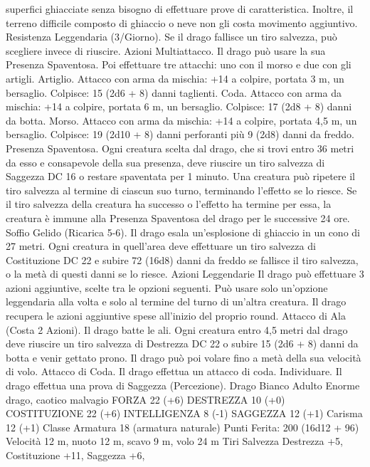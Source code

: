 \begin{multicols}{2}
superfici ghiacciate senza bisogno di effettuare prove di
caratteristica. Inoltre, il terreno difficile composto di ghiaccio o neve
non gli costa movimento aggiuntivo.
Resistenza Leggendaria (3/Giorno). Se il drago fallisce un tiro
salvezza, può scegliere invece di riuscire.
Azioni
Multiattacco. Il drago può usare la sua Presenza Spaventosa. Poi
effettuare tre attacchi: uno con il morso e due con gli artigli.
Artiglio. Attacco con arma da mischia: +14 a colpire, portata 3
m, un bersaglio.
Colpisce: 15 (2d6 + 8) danni taglienti.
Coda. Attacco con arma da mischia: +14 a colpire, portata 6 m,
un bersaglio.
Colpisce: 17 (2d8 + 8) danni da botta.
Morso. Attacco con arma da mischia: +14 a colpire, portata 4,5
m, un bersaglio.
Colpisce: 19 (2d10 + 8) danni perforanti più 9 (2d8) danni da freddo.
Presenza Spaventosa. Ogni creatura scelta dal drago, che si trovi
entro 36 metri da esso e consapevole della sua presenza, deve
riuscire un tiro salvezza di Saggezza DC 16 o restare spaventata per
1 minuto. Una creatura può ripetere il tiro salvezza al termine di
ciascun suo turno, terminando l’effetto se lo riesce. Se il tiro salvezza
della creatura ha successo o l’effetto ha termine per essa, la creatura è
immune alla Presenza Spaventosa del drago per le successive 24 ore.
Soffio Gelido (Ricarica 5-6). Il drago esala un’esplosione di ghiaccio
in un cono di 27 metri. Ogni creatura in quell’area deve effettuare un tiro
salvezza di Costituzione DC 22 e subire 72 (16d8) danni da freddo se
fallisce il tiro salvezza, o la metà di questi danni se lo riesce.
Azioni Leggendarie
Il drago può effettuare 3 azioni aggiuntive, scelte tra le opzioni
seguenti. Può usare solo un’opzione leggendaria alla volta e solo
al termine del turno di un’altra creatura. Il drago recupera le
azioni aggiuntive spese all’inizio del proprio round.
Attacco di Ala (Costa 2 Azioni). Il drago batte le ali. Ogni creatura
entro 4,5 metri dal drago deve riuscire un tiro salvezza di Destrezza
DC 22 o subire 15 (2d6 + 8) danni da botta e venir gettato prono.
Il drago può poi volare fino a metà della sua velocità di volo.
Attacco di Coda. Il drago effettua un attacco di coda.
Individuare. Il drago effettua una prova di Saggezza (Percezione).
Drago Bianco Adulto
Enorme drago, caotico malvagio
FORZA 22 (+6)
DESTREZZA 10 (+0)
COSTITUZIONE 22 (+6)
INTELLIGENZA 8 (-1)
SAGGEZZA 12 (+1)
Carisma 12 (+1)
Classe Armatura 18 (armatura naturale)
\hspace*{0pt}\hfill{Punti Ferita}: 200 (16d12 + 96)
Velocità 12 m, nuoto 12 m, scavo 9 m, volo 24 m
Tiri Salvezza Destrezza +5, Costituzione +11, Saggezza +6,

\end{multicols}
